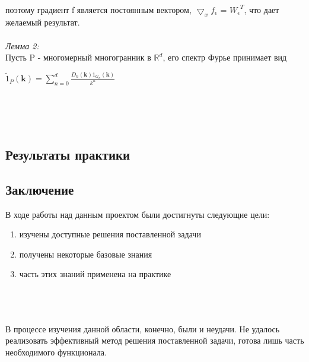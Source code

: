 \documentclass{article}
\begin{document}
    \\
    поэтому градиент f является постоянным вектором, $\bigtriangledown_{x}f_{\epsilon}$ = ${W_{\epsilon}}^{T}$, что дает желаемый результат.
    \\ \\
    \textit{Лемма 2:}
    \\
    Пусть P - многомерный многогранник в ${\mathbb{R}}^d$, его спектр Фурье принимает вид
    \begin{center}
    $\tilde{1}_{P}(\textbf{k}) = \sum\limits_{n=0}^{d}{\frac{D_n(\textbf{k})1_{G_{n}}(\textbf{k})}{k^n}}$ 
    \end{center}
    \\
    \textbf {\textit{}}
    \\
    \textbf {\textit{}}
    \\
    \newpage
    \begin{center} 
    \section{Результаты практики}
    \end{center}
    \large
    
    \newpage
    \begin{center} 
    \section{Заключение}
    \end{center}
    \large
    В ходе работы над данным проектом были достигнуты следующие цели:\\
    \begin{enumerate}
        \item изучены доступные решения поставленной задачи
        \item получены некоторые базовые знания
        \item часть этих знаний применена на практике
    \end{enumerate}
    \\ \\ \\
    В процессе изучения данной области, конечно, были и неудачи. Не удалось реализовать эффективный метод решения поставленной задачи, готова лишь часть необходимого функционала.
    \\ \\
    
\end{document}
